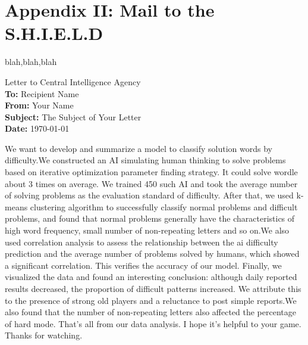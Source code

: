 \documentclass[12pt]{article}  %
\begin{document}
\section{Appendix II: Mail to the S.H.I.E.L.D}
blah,blah,blah






\clearpage
\pagestyle{fancy}
\fancyhead{} %
\begin{letter}{Letter to Central Intelligence Agency}
	\textbf{}\\
	\textbf{To:} Recipient Name \\
	\textbf{From:} Your Name \\
	\textbf{Subject:} The Subject of Your Letter \\
	\textbf{Date:} \today \\
	\textbf{}
	\begin{multicols}{2}
	We want to develop and summarize a model to classify solution words by difficulty.We constructed an AI
	simulating human thinking to solve problems based
	on iterative optimization parameter finding strategy.
	It could solve wordle about 3 times on average. We
	trained 450 such AI and took the average number of
	solving problems as the evaluation standard of difficulty. After that, we used k-means clustering algorithm
	to successfully classify normal problems and difficult
	problems, and found that normal problems generally
	have the characteristics of high word frequency, small
	number of non-repeating letters and so on.We also used
	correlation analysis to assess the relationship between
	the ai difficulty prediction and the average number
	of problems solved by humans, which showed a significant correlation. This verifies the accuracy of our
	model.
	Finally, we visualized the data and found an interesting conclusion: although daily reported results decreased, the proportion of difficult patterns increased.
	We attribute this to the presence of strong old players
	and a reluctance to post simple reports.We also found
	that the number of non-repeating letters also affected
	the percentage of hard mode.
	That’s all from our data analysis. I hope it’s helpful
	to your game. Thanks for watching.
	\end{multicols}
	
\end{letter}




\setcounter{savedpage}{\value{page}}
 
\setcounter{page}{\value{savedpage}}
\end{document}
